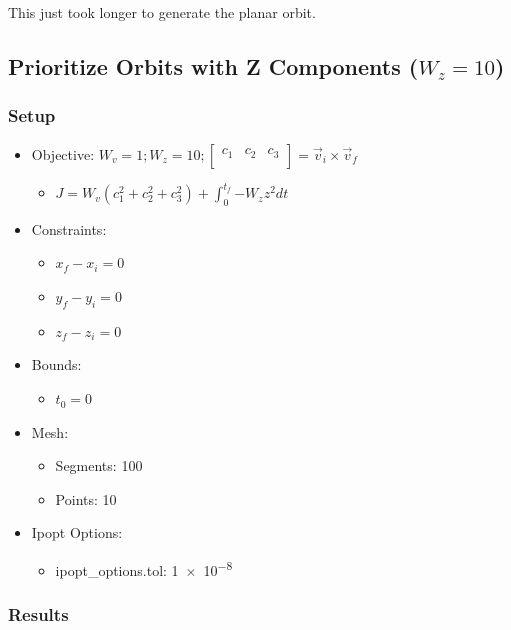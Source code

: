 \documentclass{article}
\begin{document}
This just took longer to generate the planar orbit.

\newpage

\subsection{Prioritize Orbits with Z Components ($W_z = 10$)}

\subsubsection{Setup}

\begin{itemize}
    \item Objective: $W_v = 1; W_z = 10; \left[\begin{matrix}c_1&c_2&c_3\\\end{matrix}\right] = \vec{v}_i\times\vec{v}_f$
    \begin{itemize}
        \item $J = W_v\left(c_1^2 + c_2^2 + c_3^2\right) + \int_{0}^{t_f}{-W_zz^2dt}$
    \end{itemize}
    \item Constraints:
    \begin{itemize}
        \item $x_f - x_i = 0$
        \item $y_f - y_i = 0$
        \item $z_f - z_i = 0$
    \end{itemize}
    \item Bounds:
    \begin{itemize}
        \item $t_0 = 0$
    \end{itemize}
    \item Mesh:
    \begin{itemize}
        \item Segments: 100
        \item Points: 10
    \end{itemize}
    \item Ipopt Options:
    \begin{itemize}
        \item ipopt\_options.tol: \num{1e-8}
    \end{itemize}
\end{itemize}

\subsubsection{Results}
\end{document}

